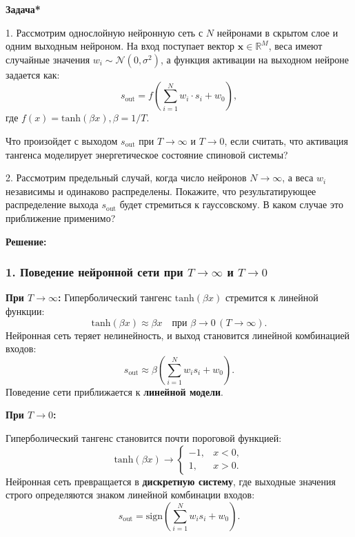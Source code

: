 \begin{description}
	      \textbf{Задача*}

	      1. Рассмотрим однослойную нейронную сеть с \( N \) нейронами в скрытом слое и одним выходным нейроном. На вход поступает вектор \( \mathbf{x} \in \mathbb{R}^M \), веса имеют случайные значения \( w_i \sim \mathcal{N}(0, \sigma^2) \), а функция активации на выходном нейроне задается как:
	      \[
		      s_\text{out} = f\left( \sum_{i=1}^N w_i \cdot s_i + w_0 \right),
	      \]
	      где \( f(x) = \mathrm{tanh}(\beta x), \beta = 1/T \).

	      Что произойдет с выходом \( s_\text{out} \) при \( T \to \infty \) и \( T \to 0 \), если считать, что активация тангенса моделирует энергетическое состояние спиновой системы?

	      2. Рассмотрим предельный случай, когда число нейронов \( N \to \infty \), а веса \( w_i \) независимы и одинаково распределены. Покажите, что результатирующее распределение выхода \( s_\text{out} \) будет стремиться к гауссовскому. В каком случае это приближение применимо?

	      \textbf{Решение:}

	      \subsubsection*{1. Поведение нейронной сети при \( T \to \infty \) и \( T \to 0 \)}

	      \textbf{При \( T \to \infty \):}
	      Гиперболический тангенс \( \mathrm{tanh}(\beta x) \) стремится к линейной функции:
	      \[
		      \mathrm{tanh}(\beta x) \approx \beta x \quad \text{при } \beta \to 0 \, (T \to \infty).
	      \]
	      Нейронная сеть теряет нелинейность, и выход становится линейной комбинацией входов:
	      \[
		      s_\text{out} \approx \beta \left( \sum_{i=1}^N w_i s_i + w_0 \right).
	      \]
	      Поведение сети приближается к \textbf{линейной модели}.

	      \textbf{При \( T \to 0 \):}

	      Гиперболический тангенс становится почти пороговой функцией:
	      \[
		      \mathrm{tanh}(\beta x) \to
		      \begin{cases}
			      -1, & x < 0, \\
			      1,  & x > 0.
		      \end{cases}
	      \]
	      Нейронная сеть превращается в \textbf{дискретную систему}, где выходные значения строго определяются знаком линейной комбинации входов:
	      \[
		      s_\text{out} = \text{sign} \left( \sum_{i=1}^N w_i s_i + w_0 \right).
	      \]


\end{description}
